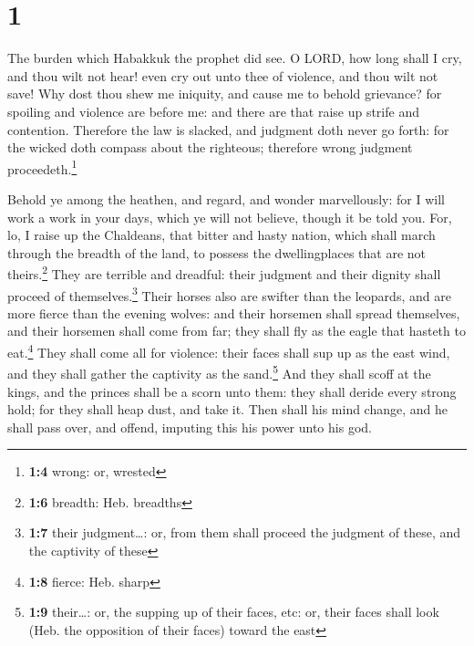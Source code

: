 \hypertarget{section}{%
\section{1}\label{section}}

 The burden which Habakkuk the prophet did see.
 O LORD, how long shall I cry, and thou wilt not hear!
even cry out unto thee of violence, and thou wilt not save!
 Why dost thou shew me iniquity, and cause me to behold
grievance? for spoiling and violence are before me: and there are that
raise up strife and contention.  Therefore the law is
slacked, and judgment doth never go forth: for the wicked doth compass
about the righteous; therefore wrong judgment proceedeth.\footnote{\textbf{1:4}
  wrong: or, wrested}

 Behold ye among the heathen, and regard, and wonder
marvellously: for I will work a work in your days, which ye will not
believe, though it be told you.  For, lo, I raise up the
Chaldeans, that bitter and hasty nation, which shall march through the
breadth of the land, to possess the dwellingplaces that are not
theirs.\footnote{\textbf{1:6} breadth: Heb. breadths} 
They are terrible and dreadful: their judgment and their dignity shall
proceed of themselves.\footnote{\textbf{1:7} their judgment\ldots: or,
  from them shall proceed the judgment of these, and the captivity of
  these}  Their horses also are swifter than the leopards,
and are more fierce than the evening wolves: and their horsemen shall
spread themselves, and their horsemen shall come from far; they shall
fly as the eagle that hasteth to eat.\footnote{\textbf{1:8} fierce: Heb.
  sharp}  They shall come all for violence: their faces
shall sup up as the east wind, and they shall gather the captivity as
the sand.\footnote{\textbf{1:9} their\ldots: or, the supping up of their
  faces, etc: or, their faces shall look (Heb. the opposition of their
  faces) toward the east}  And they shall scoff at the
kings, and the princes shall be a scorn unto them: they shall deride
every strong hold; for they shall heap dust, and take it.
 Then shall his mind change, and he shall pass over, and
offend, imputing this his power unto his god.


